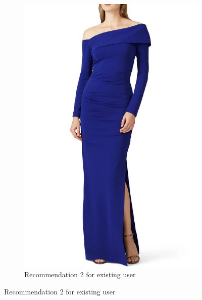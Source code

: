 \documentclass[conference]{IEEEtran}
\begin{document}
\begin{figure}[!htbp]
\begin{subfigure}[b]{0.4\textwidth}
    \includegraphics[width=\textwidth]{r2.jpg}
    \caption{Recommendation 2 for existing user}
    \label{fig:Recommendations2}
  \end{subfigure}

\end{figure}

\end{document}
